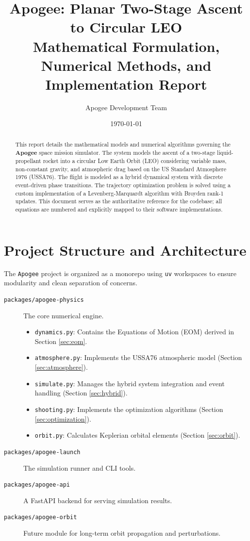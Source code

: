 \documentclass[11pt]{article}
\title{Apogee: Planar Two-Stage Ascent to Circular LEO \\ \large Mathematical Formulation, Numerical Methods, and Implementation Report}
\author{Apogee Development Team}
\date{\today}
\begin{document}
\maketitle

\begin{abstract}
This report details the mathematical models and numerical algorithms governing the \textbf{Apogee} space mission simulator. The system models the ascent of a two-stage liquid-propellant rocket into a circular Low Earth Orbit (LEO) considering variable mass, non-constant gravity, and atmospheric drag based on the US Standard Atmosphere 1976 (USSA76). The flight is modeled as a hybrid dynamical system with discrete event-driven phase transitions. The trajectory optimization problem is solved using a custom implementation of a Levenberg-Marquardt algorithm with Broyden rank-1 updates. This document serves as the authoritative reference for the codebase; all equations are numbered and explicitly mapped to their software implementations.
\end{abstract}

\tableofcontents
\newpage

\section{Project Structure and Architecture}

The \texttt{Apogee} project is organized as a monorepo using \texttt{uv} workspaces to ensure modularity and clean separation of concerns.

\begin{description}
    \item[\texttt{packages/apogee-physics}] The core numerical engine.
    \begin{itemize}
        \item \texttt{dynamics.py}: Contains the Equations of Motion (EOM) derived in Section \ref{sec:eom}.
        \item \texttt{atmosphere.py}: Implements the USSA76 atmospheric model (Section \ref{sec:atmosphere}).
        \item \texttt{simulate.py}: Manages the hybrid system integration and event handling (Section \ref{sec:hybrid}).
        \item \texttt{shooting.py}: Implements the optimization algorithms (Section \ref{sec:optimization}).
        \item \texttt{orbit.py}: Calculates Keplerian orbital elements (Section \ref{sec:orbit}).
    \end{itemize}
    \item[\texttt{packages/apogee-launch}] The simulation runner and CLI tools.
    \item[\texttt{packages/apogee-api}] A FastAPI backend for serving simulation results.
    \item[\texttt{packages/apogee-orbit}] Future module for long-term orbit propagation and perturbations.
\end{description}
\end{document}
